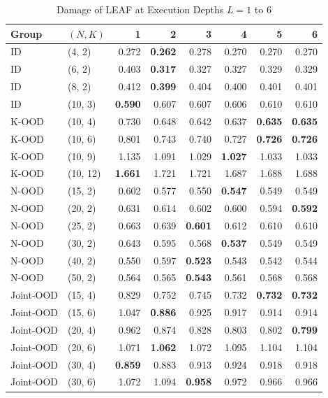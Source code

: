 \begin{table}[!t]
\centering
\scriptsize
\setlength{\tabcolsep}{2.6pt}
\caption{Damage of LEAF at Execution Depths $L=1$ to $6$}
\label{tab:s-depth}
\begin{tabular}{@{}llrrrrrr@{}}
\toprule
Group & $(N,K)$ & 1 & 2 & 3 & 4 & 5 & 6\\
\midrule
ID & (4, 2) & 0.272 & \textbf{0.262} & 0.278 & 0.270 & 0.270 & 0.270\\
ID & (6, 2) & 0.403 & \textbf{0.317} & 0.327 & 0.327 & 0.329 & 0.329\\
ID & (8, 2) & 0.412 & \textbf{0.399} & 0.404 & 0.400 & 0.401 & 0.401\\
ID & (10, 3) & \textbf{0.590} & 0.607 & 0.607 & 0.606 & 0.610 & 0.610\\
K-OOD & (10, 4) & 0.730 & 0.648 & 0.642 & 0.637 & \textbf{0.635} & \textbf{0.635}\\
K-OOD & (10, 6) & 0.801 & 0.743 & 0.740 & 0.727 & \textbf{0.726} & \textbf{0.726}\\
K-OOD & (10, 9) & 1.135 & 1.091 & 1.029 & \textbf{1.027} & 1.033 & 1.033\\
K-OOD & (10, 12) & \textbf{1.661} & 1.721 & 1.721 & 1.687 & 1.688 & 1.688\\
N-OOD & (15, 2) & 0.602 & 0.577 & 0.550 & \textbf{0.547} & 0.549 & 0.549\\
N-OOD & (20, 2) & 0.631 & 0.614 & 0.602 & 0.600 & 0.594 & \textbf{0.592}\\
N-OOD & (25, 2) & 0.663 & 0.639 & \textbf{0.601} & 0.612 & 0.610 & 0.610\\
N-OOD & (30, 2) & 0.643 & 0.595 & 0.568 & \textbf{0.537} & 0.549 & 0.549\\
N-OOD & (40, 2) & 0.550 & 0.597 & \textbf{0.523} & 0.543 & 0.542 & 0.544\\
N-OOD & (50, 2) & 0.564 & 0.565 & \textbf{0.543} & 0.561 & 0.568 & 0.568\\
Joint-OOD & (15, 4) & 0.829 & 0.752 & 0.745 & 0.732 & \textbf{0.732} & \textbf{0.732}\\
Joint-OOD & (15, 6) & 1.047 & \textbf{0.886} & 0.925 & 0.917 & 0.914 & 0.914\\
Joint-OOD & (20, 4) & 0.962 & 0.874 & 0.828 & 0.803 & 0.802 & \textbf{0.799}\\
Joint-OOD & (20, 6) & 1.071 & \textbf{1.062} & 1.072 & 1.095 & 1.104 & 1.104\\
Joint-OOD & (30, 4) & \textbf{0.859} & 0.883 & 0.913 & 0.924 & 0.918 & 0.918\\
Joint-OOD & (30, 6) & 1.072 & 1.094 & \textbf{0.958} & 0.972 & 0.966 & 0.966\\

\end{tabular}
\end{table}
